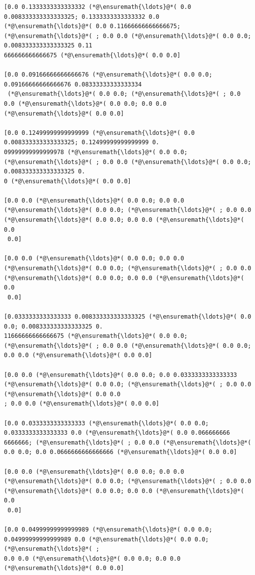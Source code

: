 \documentclass[12pt,a4paper]{article}
\begin{document}
\begin{lstlisting}
[0.0 0.1333333333333332 (*@\ensuremath{\ldots}@*( 0.0 0.008333333333333325; 0.1333333333333332 0.0 
(*@\ensuremath{\ldots}@*( 0.0 0.11666666666666675; (*@\ensuremath{\ldots}@*( ; 0.0 0.0 (*@\ensuremath{\ldots}@*( 0.0 0.0; 0.008333333333333325 0.11
666666666666675 (*@\ensuremath{\ldots}@*( 0.0 0.0]

[0.0 0.09166666666666676 (*@\ensuremath{\ldots}@*( 0.0 0.0; 0.09166666666666676 0.08333333333333334
 (*@\ensuremath{\ldots}@*( 0.0 0.0; (*@\ensuremath{\ldots}@*( ; 0.0 0.0 (*@\ensuremath{\ldots}@*( 0.0 0.0; 0.0 0.0 (*@\ensuremath{\ldots}@*( 0.0 0.0]

[0.0 0.12499999999999999 (*@\ensuremath{\ldots}@*( 0.0 0.008333333333333325; 0.12499999999999999 0.
09999999999999978 (*@\ensuremath{\ldots}@*( 0.0 0.0; (*@\ensuremath{\ldots}@*( ; 0.0 0.0 (*@\ensuremath{\ldots}@*( 0.0 0.0; 0.008333333333333325 0.
0 (*@\ensuremath{\ldots}@*( 0.0 0.0]

[0.0 0.0 (*@\ensuremath{\ldots}@*( 0.0 0.0; 0.0 0.0 (*@\ensuremath{\ldots}@*( 0.0 0.0; (*@\ensuremath{\ldots}@*( ; 0.0 0.0 (*@\ensuremath{\ldots}@*( 0.0 0.0; 0.0 0.0 (*@\ensuremath{\ldots}@*( 0.0
 0.0]

[0.0 0.0 (*@\ensuremath{\ldots}@*( 0.0 0.0; 0.0 0.0 (*@\ensuremath{\ldots}@*( 0.0 0.0; (*@\ensuremath{\ldots}@*( ; 0.0 0.0 (*@\ensuremath{\ldots}@*( 0.0 0.0; 0.0 0.0 (*@\ensuremath{\ldots}@*( 0.0
 0.0]

[0.0333333333333333 0.008333333333333325 (*@\ensuremath{\ldots}@*( 0.0 0.0; 0.008333333333333325 0.
11666666666666675 (*@\ensuremath{\ldots}@*( 0.0 0.0; (*@\ensuremath{\ldots}@*( ; 0.0 0.0 (*@\ensuremath{\ldots}@*( 0.0 0.0; 0.0 0.0 (*@\ensuremath{\ldots}@*( 0.0 0.0]

[0.0 0.0 (*@\ensuremath{\ldots}@*( 0.0 0.0; 0.0 0.0333333333333333 (*@\ensuremath{\ldots}@*( 0.0 0.0; (*@\ensuremath{\ldots}@*( ; 0.0 0.0 (*@\ensuremath{\ldots}@*( 0.0 0.0
; 0.0 0.0 (*@\ensuremath{\ldots}@*( 0.0 0.0]

[0.0 0.0333333333333333 (*@\ensuremath{\ldots}@*( 0.0 0.0; 0.0333333333333333 0.0 (*@\ensuremath{\ldots}@*( 0.0 0.066666666
6666666; (*@\ensuremath{\ldots}@*( ; 0.0 0.0 (*@\ensuremath{\ldots}@*( 0.0 0.0; 0.0 0.0666666666666666 (*@\ensuremath{\ldots}@*( 0.0 0.0]

[0.0 0.0 (*@\ensuremath{\ldots}@*( 0.0 0.0; 0.0 0.0 (*@\ensuremath{\ldots}@*( 0.0 0.0; (*@\ensuremath{\ldots}@*( ; 0.0 0.0 (*@\ensuremath{\ldots}@*( 0.0 0.0; 0.0 0.0 (*@\ensuremath{\ldots}@*( 0.0
 0.0]

[0.0 0.04999999999999989 (*@\ensuremath{\ldots}@*( 0.0 0.0; 0.04999999999999989 0.0 (*@\ensuremath{\ldots}@*( 0.0 0.0; (*@\ensuremath{\ldots}@*( ; 
0.0 0.0 (*@\ensuremath{\ldots}@*( 0.0 0.0; 0.0 0.0 (*@\ensuremath{\ldots}@*( 0.0 0.0]


\end{lstlisting}
\end{document}
